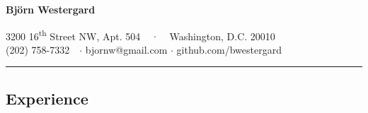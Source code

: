 \documentclass[10pt,letterpaper]{article}
\begin{document}
\begin{center}
{\Huge \textbf{Björn Westergard}}
\vspace{.8em}

3200 16\textsuperscript{th} Street NW, Apt. 504 \ \ {$\cdot$}
\ \ Washington, D.C. 20010
\\
(202) 758-7332\ \ {$\cdot$}
bjornw@gmail.com {$\cdot$}
github.com/bwestergard
\end{center}

\begin{center}
\hrule
\vspace{-0.4em}
\subsection*{Experience}
\end{center}
\end{document}
